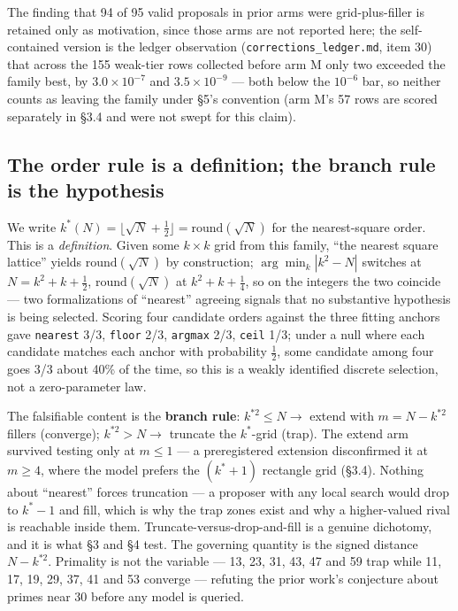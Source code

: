 The finding that 94 of 95 valid proposals in prior arms were grid-plus-filler is retained only as
motivation, since those arms are not reported here; the self-contained version is the ledger
observation (\texttt{corrections\_ledger.md}, item 30) that across the 155 weak-tier rows collected before arm M only two exceeded the
family best, by $3.0\times10^{-7}$ and $3.5\times10^{-9}$ --- both below the $10^{-6}$ bar, so neither counts as leaving the family under \S5's convention (arm M's 57 rows are scored separately in \S3.4 and were not swept
for this claim).

\subsection{The order rule is a definition; the branch rule is the hypothesis}

We write $k^*(N) = \lfloor \sqrt{N} + \tfrac{1}{2} \rfloor = \mathrm{round}(\sqrt{N})$ for the nearest-square order. This is a \emph{definition}. Given some $k \times k$ grid from this family, ``the nearest
square lattice'' yields $\mathrm{round}(\sqrt{N})$ by construction; $\arg\min_k |k^2 - N|$ switches at
$N = k^2 + k + \tfrac{1}{2}$, $\mathrm{round}(\sqrt{N})$ at $k^2 + k + \tfrac{1}{4}$, so on the integers the two coincide
--- two formalizations of ``nearest'' agreeing signals that no substantive hypothesis
is being selected. Scoring four candidate orders against the three fitting anchors gave
\texttt{nearest} 3/3, \texttt{floor} 2/3, \texttt{argmax} 2/3, \texttt{ceil} 1/3; under a null where each candidate matches
each anchor with probability $\tfrac{1}{2}$, some candidate among four goes 3/3 about 40\% of the time, so
this is a weakly identified discrete selection, not a zero-parameter law.

The falsifiable content is the \textbf{branch rule}: $k^{*2} \le N \rightarrow$ extend with $m = N - k^{*2}$ fillers
(converge); $k^{*2} > N \rightarrow$ truncate the $k^*$-grid (trap). The extend arm survived testing only at
$m \le 1$ --- a preregistered extension disconfirmed it at $m \ge 4$, where the model prefers the
$(k^*{+}1)$ rectangle grid (\S3.4). Nothing about ``nearest'' forces truncation ---
a proposer with any local search would drop to $k^*{-}1$ and fill, which is why the trap zones exist
and why a higher-valued rival is reachable inside them. Truncate-versus-drop-and-fill is a
genuine dichotomy, and it is what \S3 and \S4 test. The governing quantity is the signed distance
$N - k^{*2}$. Primality is not the variable --- 13, 23, 31, 43, 47 and 59 trap while 11, 17, 19, 29,
37, 41 and 53 converge --- refuting the prior work's conjecture about primes near 30 before any
model is queried.

